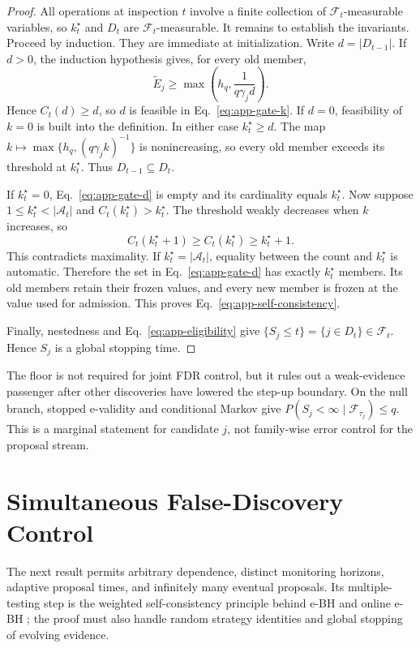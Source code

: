 \begin{proof}
All operations at inspection \(t\) involve a finite collection of
\(\mathcal F_t\)-measurable variables, so \(k_t^\star\) and \(D_t\) are
\(\mathcal F_t\)-measurable.  It remains to establish the invariants.
Proceed by induction.  They are immediate at initialization.  Write
\(d=|D_{t-1}|\).  If \(d>0\), the induction hypothesis gives, for every old
member,
\[
  \widetilde E_j\geq
  \max\!\left(h_q,\frac{1}{q\gamma_jd}\right).
\]
Hence \(C_t(d)\geq d\), so \(d\) is feasible in
Eq.~\eqref{eq:app-gate-k}.  If \(d=0\), feasibility of \(k=0\) is built into
the definition.  In either case \(k_t^\star\geq d\).  The map
\(k\mapsto\max\{h_q,(q\gamma_jk)^{-1}\}\) is nonincreasing, so every old
member exceeds its threshold at \(k_t^\star\).  Thus
\(D_{t-1}\subseteq D_t\).

If \(k_t^\star=0\), Eq.~\eqref{eq:app-gate-d} is empty and its cardinality
equals \(k_t^\star\).  Now suppose \(1\leq k_t^\star<|\mathcal A_t|\) and
\(C_t(k_t^\star)>k_t^\star\).  The threshold weakly decreases when \(k\)
increases, so
\[
 C_t(k_t^\star+1)\geq C_t(k_t^\star)\geq k_t^\star+1.
\]
This contradicts maximality.  If
\(k_t^\star=|\mathcal A_t|\), equality between the count and
\(k_t^\star\) is automatic.  Therefore the set in
Eq.~\eqref{eq:app-gate-d} has exactly \(k_t^\star\) members.  Its old members
retain their frozen values, and every new member is frozen at the value used
for admission.  This proves Eq.~\eqref{eq:app-self-consistency}.

Finally, nestedness and Eq.~\eqref{eq:app-eligibility} give
\(\{S_j\leq t\}=\{j\in D_t\}\in\mathcal F_t\).  Hence \(S_j\) is a global
stopping time.
\end{proof}

The floor is not required for joint FDR control, but it rules out a
weak-evidence passenger after other discoveries have lowered the step-up
boundary.  On the null branch, stopped e-validity and conditional Markov give
\(P(S_j<\infty\mid\mathcal F_{\tau_j})\leq q\).  This is a marginal statement
for candidate \(j\), not family-wise error control for the proposal stream.

\section{Simultaneous False-Discovery Control}
\label{app:supfdr}

The next result permits arbitrary dependence, distinct monitoring horizons,
adaptive proposal times, and infinitely many eventual proposals.  Its
multiple-testing step is the weighted
self-consistency principle behind e-BH and online e-BH
\cite{wang2022false,xu2024online,fischer2024online}; the proof must also
handle random strategy identities and global stopping of evolving evidence.

